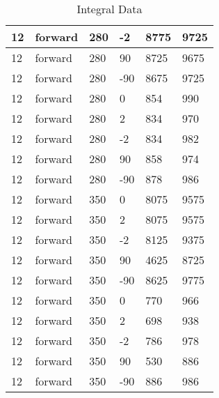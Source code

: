 \begin{table}
\begin{center}
\begin{tabular}{|l|l|l|l|l|l|}
			\hline
			12 & forward & 280 & -2 & 8775 & 9725 \\
			\hline
			12 & forward & 280 & 90 & 8725 & 9675 \\
			\hline
			12 & forward & 280 & -90 & 8675 & 9725 \\
			\hline
			12 & forward & 280 & 0 & 854 & 990 \\
			\hline
			12 & forward & 280 & 2 & 834 & 970 \\
			\hline
			12 & forward & 280 & -2 & 834 & 982 \\
			\hline
			12 & forward & 280 & 90 & 858 & 974 \\
			\hline
			12 & forward & 280 & -90 & 878 & 986 \\
			\hline
			12 & forward & 350 & 0 & 8075 & 9575 \\
			\hline
			12 & forward & 350 & 2 & 8075 & 9575 \\
			\hline
			12 & forward & 350 & -2 & 8125 & 9375 \\
			\hline
			12 & forward & 350 & 90 & 4625 & 8725 \\
			\hline
			12 & forward & 350 & -90 & 8625 & 9775 \\
			\hline
			12 & forward & 350 & 0 & 770 & 966 \\
			\hline
			12 & forward & 350 & 2 & 698 & 938 \\
			\hline
			12 & forward & 350 & -2 & 786 & 978 \\
			\hline
			12 & forward & 350 & 90 & 530 & 886 \\
			\hline
			12 & forward & 350 & -90 & 886 & 986 \\
			\hline
		\end{tabular}
	\end{center}
	\caption{Integral Data}
	\label{tab:sum}
\end{table}